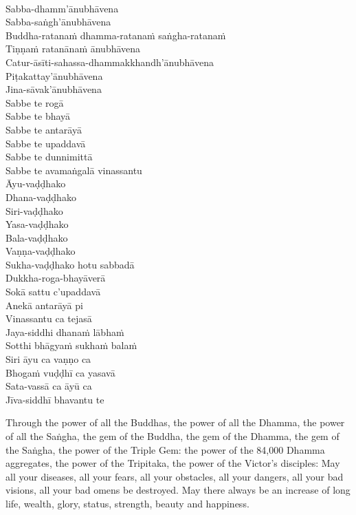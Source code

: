 \begin{pali-hang}
  \\
  Sabba-dhamm'ānubhāvena\\
  Sabba-saṅgh'ānubhāvena\\
  Buddha-ratanaṁ dhamma-ratanaṁ saṅgha-ratanaṁ\\
  Tiṇṇaṁ ratanānaṁ ānubhāvena\\
  Catur-āsīti-sahassa-dhammakkhandh'ānubhāvena\\
  Piṭakattay'ānubhāvena\\
  Jina-sāvak'ānubhāvena\\
  Sabbe te rogā\\
  Sabbe te bhayā\\
  Sabbe te antarāyā\\
  Sabbe te upaddavā\\
  Sabbe te dunnimittā\\
  Sabbe te avamaṅgalā vinassantu\\
  Āyu-vaḍḍhako\\
  Dhana-vaḍḍhako\\
  Siri-vaḍḍhako\\
  Yasa-vaḍḍhako\\
  Bala-vaḍḍhako\\
  Vaṇṇa-vaḍḍhako\\
  Sukha-vaḍḍhako hotu sabbadā\\
  Dukkha-roga-bhayāverā\\
  Sokā sattu c'upaddavā\\
  Anekā antarāyā pi\\
  Vinassantu ca tejasā\\
  Jaya-siddhi dhanaṁ lābhaṁ\\
  Sotthi bhāgyaṁ sukhaṁ balaṁ\\
  Siri āyu ca vaṇṇo ca\\
  Bhogaṁ vuḍḍhī ca yasavā\\
  Sata-vassā ca āyū ca\\
  Jīva-siddhī bhavantu te
\end{pali-hang}

\begin{english-hang-verses}
  Through the power of all the Buddhas, the power of all the Dhamma, the power of all the Saṅgha, the gem of the Buddha, the gem of the Dhamma, the gem of the Saṅgha, the power of the Triple Gem: the power of the 84,000 Dhamma aggregates, the power of the Tripitaka, the power of the Victor's disciples: May all your diseases, all your fears, all your obstacles, all your dangers, all your bad visions, all your bad omens be destroyed. May there always be an increase of long life, wealth, glory, status, strength, beauty and happiness.
\end{english-hang-verses}

